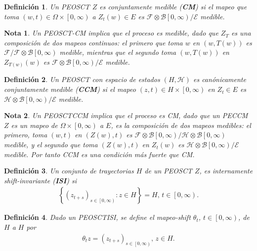 \documentclass{article}
\newtheorem{Def}{Definición}
\newtheorem{Note}{Nota}
\begin{document}
\begin{Def}
Un PEOSCT $Z$ es conjuntamente medible (\textbf{CM}) si el mapeo que toma $\left(w,t\right)\in\Omega\times\left[0,\infty\right)$ a $Z_{t}\left(w\right)\in E$ es $\mathcal{F}\otimes\mathcal{B}\left[0,\infty\right)/\mathcal{E}$ medible.
\end{Def}

\begin{Note}
Un PEOSCT-CM implica que el proceso es medible, dado que $Z_{T}$ es una composici\'on  de dos mapeos continuos: el primero que toma $w$ en $\left(w,T\left(w\right)\right)$ es $\mathcal{F}/\mathcal{F}\otimes\mathcal{B}\left[0,\infty\right)$ medible, mientras que el segundo toma $\left(w,T\left(w\right)\right)$ en $Z_{T\left(w\right)}\left(w\right)$ es $\mathcal{F}\otimes\mathcal{B}\left[0,\infty\right)/\mathcal{E}$ medible.
\end{Note}


\begin{Def}
Un PEOSCT con espacio de estados $\left(H,\mathcal{H}\right)$ es can\'onicamente conjuntamente medible (\textbf{CCM}) si el mapeo $\left(z,t\right)\in H\times\left[0,\infty\right)$ en $Z_{t}\in E$ es $\mathcal{H}\otimes\mathcal{B}\left[0,\infty\right)/\mathcal{E}$ medible.
\end{Def}

\begin{Note}
Un PEOSCTCCM implica que el proceso es CM, dado que un PECCM $Z$ es un mapeo de $\Omega\times\left[0,\infty\right)$ a $E$, es la composici\'on de dos mapeos medibles: el primero, toma $\left(w,t\right)$ en $\left(Z\left(w\right),t\right)$ es $\mathcal{F}\otimes\mathcal{B}\left[0,\infty\right)/\mathcal{H}\otimes\mathcal{B}\left[0,\infty\right)$ medible, y el segundo que toma $\left(Z\left(w\right),t\right)$  en $Z_{t}\left(w\right)$ es $\mathcal{H}\otimes\mathcal{B}\left[0,\infty\right)/\mathcal{E}$ medible. Por tanto CCM es una condici\'on m\'as fuerte que CM.
\end{Note}

\begin{Def}
Un conjunto de trayectorias $H$ de un PEOSCT $Z$, es internamente shift-invariante (\textbf{ISI}) si 
\begin{eqnarray*}
\left\{\left(z_{t+s}\right)_{s\in\left[0,\infty\right)}:z\in H\right\}=H\textrm{, }t\in\left[0,\infty\right).
\end{eqnarray*}
\end{Def}


\begin{Def}
Dado un PEOSCTISI, se define el mapeo-shift $\theta_{t}$, $t\in\left[0,\infty\right)$, de $H$ a $H$ por 
\begin{eqnarray*}
\theta_{t}z=\left(z_{t+s}\right)_{s\in\left[0,\infty\right)}\textrm{, }z\in H.
\end{eqnarray*}
\end{Def}
\end{document}
